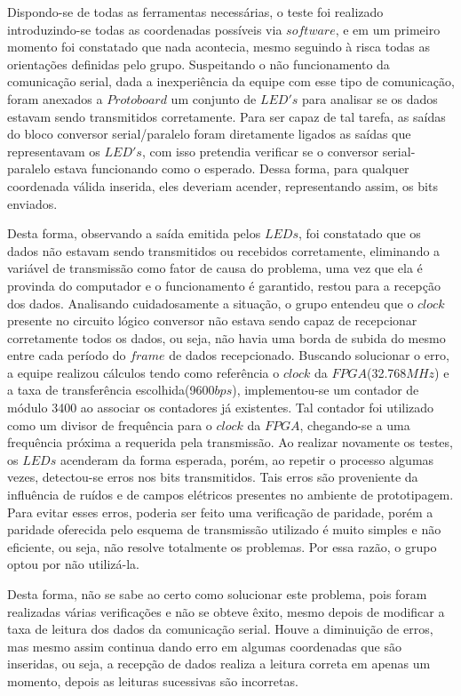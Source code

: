 \documentclass[12pt]{article}
\begin{document}
Dispondo-se de todas as ferramentas necessárias, o teste foi realizado introduzindo-se todas as coordenadas possíveis via $software$, e em um primeiro momento foi constatado que nada acontecia, mesmo seguindo à risca todas as orientações definidas pelo grupo. Suspeitando o não funcionamento da comunicação serial, dada a inexperiência da equipe com esse tipo de comunicação, foram anexados a $Protoboard$ um conjunto de $LED's$ para analisar se os dados estavam sendo transmitidos corretamente. Para ser capaz de tal tarefa, as saídas do bloco conversor serial/paralelo foram diretamente ligados as saídas que representavam os $LED's$, com isso pretendia verificar se o conversor serial-paralelo estava funcionando como o esperado. Dessa forma, para qualquer coordenada válida inserida, eles deveriam acender, representando assim, os bits enviados.


Desta forma, observando a saída emitida pelos $LEDs$, foi constatado que os dados não estavam sendo transmitidos ou recebidos corretamente, eliminando a variável de transmissão como fator de causa do problema, uma vez que ela é provinda do computador e o funcionamento é garantido, restou para a recepção dos dados. Analisando cuidadosamente a situação, o grupo entendeu que o $clock$ presente no circuito lógico conversor não estava sendo capaz de recepcionar corretamente todos os dados, ou seja, não havia uma borda de subida do mesmo entre cada período do $frame$ de dados recepcionado. Buscando solucionar o erro, a equipe realizou cálculos tendo como referência o $clock$ da $FPGA$(32.768$MHz$) e a taxa de transferência escolhida(9600$bps$), implementou-se um contador de módulo 3400 ao associar os contadores já existentes. Tal contador foi utilizado como um divisor de frequência para o $clock$ da $FPGA$, chegando-se a uma frequência próxima a requerida pela transmissão. Ao realizar novamente os testes, os $LEDs$ acenderam da forma esperada, porém, ao repetir o processo algumas vezes, detectou-se erros nos bits transmitidos. Tais erros são proveniente da influência de ruídos e de campos elétricos presentes no ambiente de prototipagem. Para evitar esses erros, poderia ser feito uma verificação de paridade, porém a paridade oferecida pelo esquema de transmissão utilizado é muito simples e não eficiente, ou seja, não resolve totalmente os problemas. Por essa razão, o grupo optou por não utilizá-la.

Desta forma, não se sabe ao certo como solucionar este problema, pois foram realizadas várias verificações e não se obteve êxito, mesmo depois de modificar a taxa de leitura dos dados da comunicação serial. Houve a diminuição de erros, mas mesmo assim continua dando erro em algumas coordenadas que são inseridas, ou seja, a recepção de dados realiza a leitura correta em apenas um momento, depois as leituras sucessivas são incorretas. 
\end{document}
